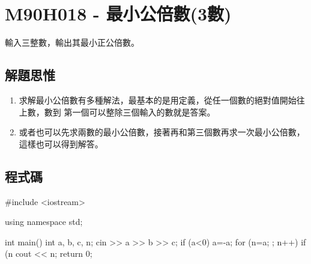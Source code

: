 \section{M90H018 - 最小公倍數(3數)}
輸入三整數，輸出其最小正公倍數。
\subsection{解題思惟}
\begin{enumerate}
	\item 求解最小公倍數有多種解法，最基本的是用定義，從任一個數的絕對值開始往上數，數到
	第一個可以整除三個輸入的數就是答案。
	\item 或者也可以先求兩數的最小公倍數，接著再和第三個數再求一次最小公倍數，這樣也可以得到解答。
\end{enumerate}

\subsection{程式碼}
\begin{cppcode}
#include <iostream>

using namespace std;

int main()
{
	int a, b, c, n;
	cin >> a >> b >> c;
	if (a<0) a=-a;
	for (n=a; ; n++) {
		if (n%
	}
	cout << n;
	return 0;
}
\end{cppcode}
